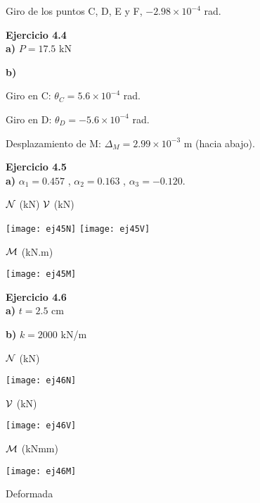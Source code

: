 Giro de los puntos C, D, E y F, $-2.98 \times 10^{-4}$ rad.\newline


\textbf{Ejercicio 4.4}\\

\textbf{a)} $P = 17.5$ kN

\textbf{b)}

Giro en C: $\theta_C = 5.6 \times 10^{-4}$ rad.

Giro en D: $\theta_D = -5.6 \times 10^{-4}$ rad.

Desplazamiento de M: $\Delta_M = 2.99 \times 10^{-3}$ m (hacia abajo).\newline


\textbf{Ejercicio 4.5}\\

\textbf{a)} $\alpha_1 = 0.457$ , $\alpha_2 = 0.163$ , $\alpha_3 = -0.120$.

${\mathcal N}$ (kN) \hspace{0.4\textwidth} ${\mathcal V}$ (kN)

\begin{center}
	\texttt{[image: ej45N]}
	\texttt{[image: ej45V]}
\end{center}

${\mathcal M}$ (kN.m)

\begin{center}
	\texttt{[image: ej45M]}
\end{center}


\textbf{Ejercicio 4.6}\\

\textbf{a)} $t = 2.5$ cm

\textbf{b)} $k = 2000$ kN/m


${\mathcal N}$ (kN)
\begin{center}
	\texttt{[image: ej46N]}
\end{center}

${\mathcal V}$ (kN)
\begin{center}
	\texttt{[image: ej46V]}
\end{center}

${\mathcal M}$ (kNmm)

\begin{center}
	\texttt{[image: ej46M]}
\end{center}


Deformada

